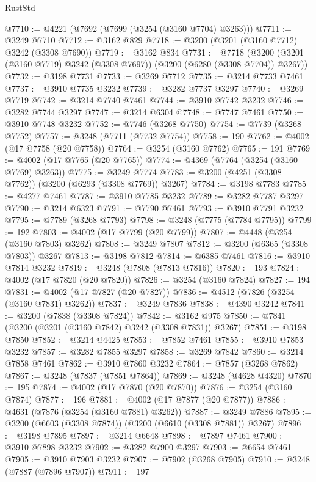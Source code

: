 \begin{lexlean}{RustStd}
\begin{coremodule}
@7710 := @4221 (@7692 (@7699 (@3254 (@3160 @7704) @3263)))
@7711 := @3249 @7710
@7712 := @3162 @829
@7718 := @3200 (@3201 (@3160 @7712) @3242 (@3308 @7690))
@7719 := @3162 @834
@7731 := @7718 (@3200 (@3201 (@3160 @7719) @3242 (@3308 @7697)) (@3200 (@6280 (@3308 @7704)) @3267))
@7732 := @3198 @7731
@7733 := @3269 @7712
@7735 := @3214 @7733 @7461
@7737 := @3910 @7735 @3232
@7739 := @3282 @7737 @3297
@7740 := @3269 @7719
@7742 := @3214 @7740 @7461
@7744 := @3910 @7742 @3232
@7746 := @3282 @7744 @3297
@7747 := @3214 @6304
@7748 := @7747 @7461
@7750 := @3910 @7748 @3232
@7752 := @7746 (@3268 @7750)
@7754 := @7739 (@3268 @7752)
@7757 := @3248 (@7711 (@7732 @7754))
@7758 := 190
@7762 := @4002 (@17 @7758 (@20 @7758))
@7764 := @3254 (@3160 @7762)
@7765 := 191
@7769 := @4002 (@17 @7765 (@20 @7765))
@7774 := @4369 (@7764 (@3254 (@3160 @7769) @3263))
@7775 := @3249 @7774
@7783 := @3200 (@4251 (@3308 @7762)) (@3200 (@6293 (@3308 @7769)) @3267)
@7784 := @3198 @7783
@7785 := @4277 @7461
@7787 := @3910 @7785 @3232
@7789 := @3282 @7787 @3297
@7790 := @3214 @6323
@7791 := @7790 @7461
@7793 := @3910 @7791 @3232
@7795 := @7789 (@3268 @7793)
@7798 := @3248 (@7775 (@7784 @7795))
@7799 := 192
@7803 := @4002 (@17 @7799 (@20 @7799))
@7807 := @4448 (@3254 (@3160 @7803) @3262)
@7808 := @3249 @7807
@7812 := @3200 (@6365 (@3308 @7803)) @3267
@7813 := @3198 @7812
@7814 := @6385 @7461
@7816 := @3910 @7814 @3232
@7819 := @3248 (@7808 (@7813 @7816))
@7820 := 193
@7824 := @4002 (@17 @7820 (@20 @7820))
@7826 := @3254 (@3160 @7824)
@7827 := 194
@7831 := @4002 (@17 @7827 (@20 @7827))
@7836 := @4512 (@7826 (@3254 (@3160 @7831) @3262))
@7837 := @3249 @7836
@7838 := @4390 @3242
@7841 := @3200 (@7838 (@3308 @7824))
@7842 := @3162 @975
@7850 := @7841 (@3200 (@3201 (@3160 @7842) @3242 (@3308 @7831)) @3267)
@7851 := @3198 @7850
@7852 := @3214 @4425
@7853 := @7852 @7461
@7855 := @3910 @7853 @3232
@7857 := @3282 @7855 @3297
@7858 := @3269 @7842
@7860 := @3214 @7858 @7461
@7862 := @3910 @7860 @3232
@7864 := @7857 (@3268 @7862)
@7867 := @3248 (@7837 (@7851 @7864))
@7869 := @3248 (@4628 @4320)
@7870 := 195
@7874 := @4002 (@17 @7870 (@20 @7870))
@7876 := @3254 (@3160 @7874)
@7877 := 196
@7881 := @4002 (@17 @7877 (@20 @7877))
@7886 := @4631 (@7876 (@3254 (@3160 @7881) @3262))
@7887 := @3249 @7886
@7895 := @3200 (@6603 (@3308 @7874)) (@3200 (@6610 (@3308 @7881)) @3267)
@7896 := @3198 @7895
@7897 := @3214 @6648
@7898 := @7897 @7461
@7900 := @3910 @7898 @3232
@7902 := @3282 @7900 @3297
@7903 := @6654 @7461
@7905 := @3910 @7903 @3232
@7907 := @7902 (@3268 @7905)
@7910 := @3248 (@7887 (@7896 @7907))
@7911 := 197

\end{coremodule}
\end{lexlean}
